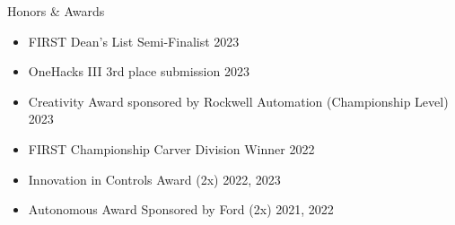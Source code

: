 \documentclass[
	11pt, %
]{tex/resume} %
\begin{document}

\begin{rSection}{Honors \& Awards}

    \begin{itemize}
        \setlength\itemsep{-0.7em} %
        \item FIRST Dean's List Semi-Finalist \hfill 2023
        \item OneHacks III 3rd place submission \hfill 2023
        \item Creativity Award sponsored by Rockwell Automation (Championship Level) \hfill 2023
        \item FIRST Championship Carver Division Winner \hfill 2022
        \item Innovation in Controls Award (2x) \hfill 2022, 2023
        \item Autonomous Award Sponsored by Ford (2x) \hfill 2021, 2022

    \end{itemize}

\end{rSection}





\end{document}
